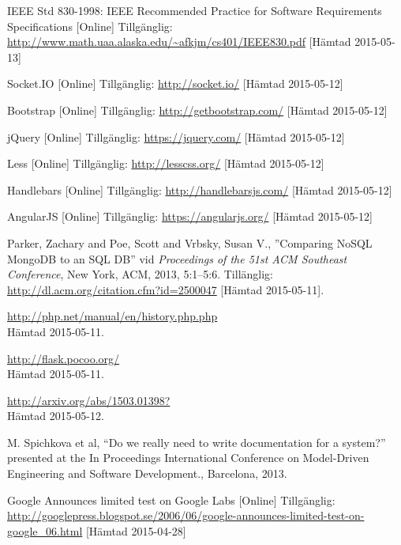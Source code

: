 \vspace{-15mm}
\renewcommand{\refname}{}
\begin{thebibliography}{9}


IEEE Std 830-1998: IEEE Recommended Practice for Software Requirements Specifications [Online] Tillgänglig:
\url{http://www.math.uaa.alaska.edu/~afkjm/cs401/IEEE830.pdf} [Hämtad 2015-05-13]

Socket.IO [Online] Tillgänglig: 
\url{http://socket.io/} [Hämtad 2015-05-12]

Bootstrap [Online] Tillgänglig: 
\url{http://getbootstrap.com/} [Hämtad 2015-05-12]

jQuery [Online] Tillgänglig: 
\url{https://jquery.com/} [Hämtad 2015-05-12]

Less [Online] Tillgänglig: 
\url{http://lesscss.org/} [Hämtad 2015-05-12]

Handlebars [Online] Tillgänglig: 
\url{http://handlebarsjs.com/} [Hämtad 2015-05-12]

AngularJS [Online] Tillgänglig: 
\url{https://angularjs.org/} [Hämtad 2015-05-12]

 Parker, Zachary and Poe, Scott and Vrbsky, Susan V., ''Comparing NoSQL MongoDB to an SQL DB'' vid \textit{Proceedings of the 51st ACM Southeast Conference}, New York, ACM, 2013, 5:1--5:6. Tillänglig: \url{http://dl.acm.org/citation.cfm?id=2500047} [Hämtad 2015-05-11].

\url{http://php.net/manual/en/history.php.php}\\
Hämtad 2015-05-11.
	
\url{http://flask.pocoo.org/}\\
Hämtad 2015-05-11.
	
\url{http://arxiv.org/abs/1503.01398?}\\
Hämtad 2015-05-12.


M. Spichkova et al, “Do we really need to write documentation for a system?” presented at the In Proceedings International Conference on Model-Driven Engineering and Software Development., Barcelona, 2013.

Google Announces limited test on Google Labs [Online] Tillgänglig: 
\url{http://googlepress.blogspot.se/2006/06/google-announces-limited-test-on-google_06.html} [Hämtad 2015-04-28]


\end{thebibliography}
